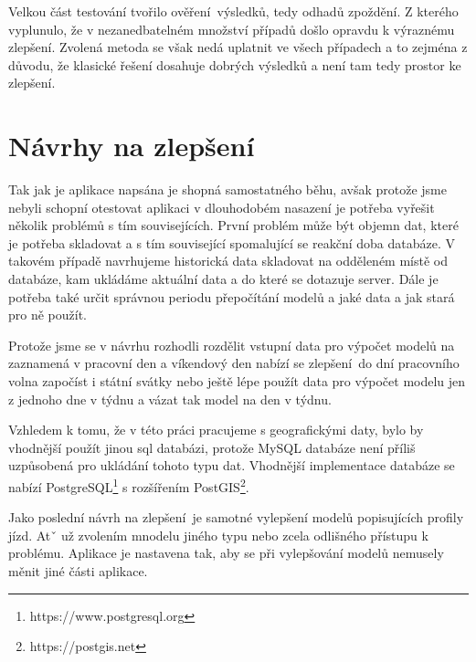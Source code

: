 Velkou část testování tvořilo ověření výsledků, tedy odhadů zpoždění. Z kterého vyplunulo, že v nezanedbatelném množství případů došlo opravdu k výraznému zlepšení. Zvolená metoda se však nedá uplatnit ve všech případech a to zejména z důvodu, že klasické řešení dosahuje dobrých výsledků a není tam tedy prostor ke zlepšení.

\section{Návrhy na zlepšení}

Tak jak je aplikace napsána je shopná samostatného běhu, avšak protože jsme nebyli schopní otestovat aplikaci v dlouhodobém nasazení je potřeba vyřešit několik problémů s tím souvisejících. První problém může být objemn dat, které je potřeba skladovat a s tím související spomalující se reakční doba databáze. V takovém případě navrhujeme historická data skladovat na odděleném místě od databáze, kam ukládáme aktuální data a do které se dotazuje server. Dále je potřeba také určit správnou periodu přepočítání modelů a jaké data a jak stará pro ně použít.

\bigbreak

Protože jsme se v návrhu rozhodli rozdělit vstupní data pro výpočet modelů na zaznamená v pracovní den a víkendový den nabízí se zlepšení do dní pracovního volna započíst i státní svátky nebo ještě lépe použít data pro výpočet modelu jen z jednoho dne v týdnu a vázat tak model na den v týdnu.

\bigbreak

Vzhledem k tomu, že v této práci pracujeme s geografickými daty, bylo by vhodnější použít jinou \gls{sql} databázi, protože MySQL databáze není příliš uzpůsobená pro ukládání tohoto typu dat. Vhodnější implementace databáze se nabízí PostgreSQL\footnote{https://www.postgresql.org} s rozšířením PostGIS\footnote{https://postgis.net}.

\bigbreak

Jako poslední návrh na zlepšení je samotné vylepšení modelů popisujících profily jízd. Atˇ už zvolením mnodelu jiného typu nebo zcela odlišného přístupu k problému. Aplikace je nastavena tak, aby se při vylepšování modelů nemusely měnit jiné části aplikace. 
